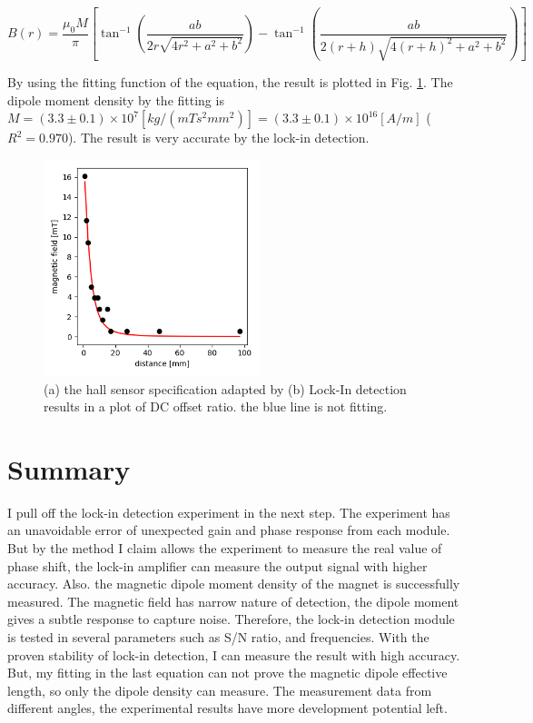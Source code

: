 \documentclass{article}
\begin{document}
\begin{equation}
  B(r) = \frac{\mu_0 M}{\pi} \left[\tan^{-1}(\frac{ab}{2r \sqrt{4r^2 +a^2 + b^2}}) - \tan^{-1}(\frac{ab}{2(r+h) \sqrt{4(r+h)^2 + a^2+b^2}})\right]
  \label{equation: magnetic field}
\end{equation}

By using the fitting function of the equation, the result is plotted in Fig. \ref{fig: hall_sensor_results}.
The dipole moment density by the fitting is $M = (3.3 \pm 0.1) \times 10^7 [kg/ (mT s^2 mm^2)] = (3.3 \pm 0.1) \times 10^{16} [A/m]$ ($R^2 = 0.970$).
The result is very accurate by the lock-in detection.

\begin{figure}[H]
  \centering
  \includegraphics[width=6.3cm]{../results/hall_sensor_plot.png}

  \caption{(a) the hall sensor specification adapted by \cite{hall_sensor} (b) Lock-In detection results in a plot of DC offset ratio. the blue line is not fitting. }
  \label{fig: hall_sensor_results}
\end{figure}


\section{Summary}
 I pull off the lock-in detection experiment in the next step.
 The experiment has an unavoidable error of unexpected gain and phase response from each module.
 But by the method I claim allows the experiment to measure the real value of phase shift, the lock-in amplifier can measure the output signal with higher accuracy.
 Also. the magnetic dipole moment density of the magnet is successfully measured.
 The magnetic field has narrow nature of detection, the dipole moment gives a subtle response to capture noise.
 Therefore, the lock-in detection module is tested in several parameters such as S/N ratio, and frequencies.
 With the proven stability of lock-in detection, I can measure the result with high accuracy.
 But, my fitting in the last equation can not prove the magnetic dipole effective length, so only the dipole density can measure.
 The measurement data from different angles, the experimental results have more development potential left.




\end{document}
